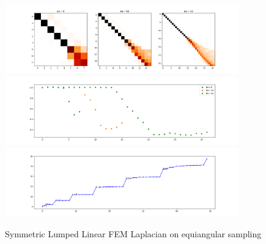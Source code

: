 \begin{figure}[h]
	\label{fig:symmetricFEMequiangularLumped}
	\caption{Symmetric Lumped Linear FEM Laplacian on equiangular sampling}
	\centering
	\includegraphics[width=0.9\textwidth]{../codes/03.FEM_laplacian/equiangular/mass_lumping/BLB/img/linearFEM.png}
	\includegraphics[width=0.9\textwidth]{../codes/03.FEM_laplacian/equiangular/mass_lumping/BLB/img/linearFEM_diagonal.png}	
	\includegraphics[width=0.9\textwidth]{../codes/03.FEM_laplacian/equiangular/mass_lumping/BLB/img/FEM_eigenvalues_32.png}	
\end{figure}